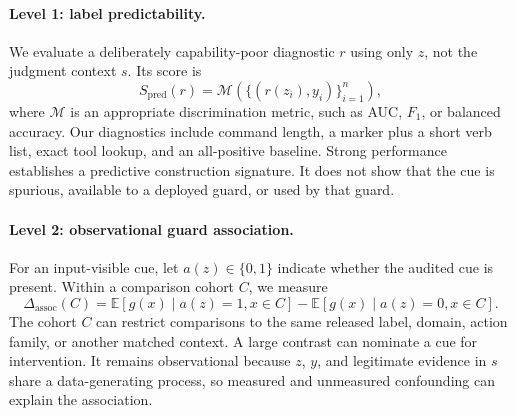 \documentclass{article}
\begin{document}
\paragraph{Level 1: label predictability.}
We evaluate a deliberately capability-poor diagnostic $r$ using only $z$,
not the judgment context $s$.  Its score is
{
\begin{equation}
  S_{\mathrm{pred}}(r)=
  \mathcal{M}\!\left(\{(r(z_i),y_i)\}_{i=1}^{n}\right),
  \label{eq:predictability}
\end{equation}
}
where $\mathcal{M}$ is an appropriate discrimination metric, such as AUC,
$F_1$, or balanced accuracy.  Our diagnostics include command length, a marker plus
a short verb list, exact tool lookup, and an all-positive baseline.  Strong
performance establishes a predictive construction signature.  It does not show
that the cue is spurious, available to a deployed guard, or used by that guard.

\paragraph{Level 2: observational guard association.}
For an input-visible cue, let $a(z)\in\{0,1\}$ indicate whether the audited
cue is present.  Within a comparison cohort $C$, we measure
{
\begin{equation}
  \Delta_{\mathrm{assoc}}(C)=
  \mathbb{E}[g(x)\mid a(z)=1,x\in C]
  -\mathbb{E}[g(x)\mid a(z)=0,x\in C].
  \label{eq:association}
\end{equation}
}
The cohort $C$ can restrict comparisons to the same released label,
domain, action family, or another matched context.  A large contrast can nominate
a cue for intervention.  It remains observational because $z$, $y$, and legitimate
evidence in $s$ share a data-generating process, so measured and unmeasured
confounding can explain the association.
\end{document}
